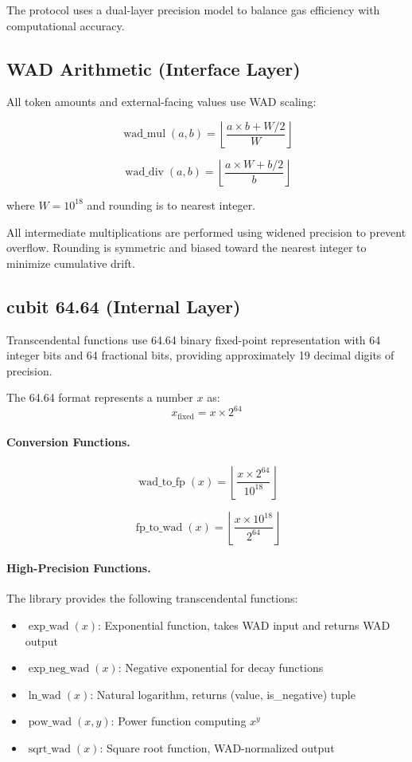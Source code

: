 The protocol uses a dual-layer precision model to balance gas efficiency with computational accuracy.

\subsection{WAD Arithmetic (Interface Layer)}

All token amounts and external-facing values use WAD scaling:

\[
\operatorname{wad\_mul}(a, b) = \left\lfloor \frac{a \times b + W/2}{W} \right\rfloor
\]

\[
\operatorname{wad\_div}(a, b) = \left\lfloor \frac{a \times W + b/2}{b} \right\rfloor
\]

where $W = 10^{18}$ and rounding is to nearest integer.

All intermediate multiplications are performed using widened precision to prevent overflow. Rounding is symmetric and biased toward the nearest integer to minimize cumulative drift.

\subsection{cubit 64.64 (Internal Layer)}

Transcendental functions use 64.64 binary fixed-point representation with 64 integer bits and 64 fractional bits, providing approximately 19 decimal digits of precision.

The 64.64 format represents a number $x$ as:
\[
x_{\text{fixed}} = x \times 2^{64}
\]

\paragraph{Conversion Functions.}

\[
\operatorname{wad\_to\_fp}(x) = \left\lfloor \frac{x \times 2^{64}}{10^{18}} \right\rfloor
\]

\[
\operatorname{fp\_to\_wad}(x) = \left\lfloor \frac{x \times 10^{18}}{2^{64}} \right\rfloor
\]

\paragraph{High-Precision Functions.}

The library provides the following transcendental functions:

\begin{itemize}
\item $\operatorname{exp\_wad}(x)$: Exponential function, takes WAD input and returns WAD output
\item $\operatorname{exp\_neg\_wad}(x)$: Negative exponential for decay functions
\item $\operatorname{ln\_wad}(x)$: Natural logarithm, returns (value, is\_negative) tuple
\item $\operatorname{pow\_wad}(x, y)$: Power function computing $x^y$
\item $\operatorname{sqrt\_wad}(x)$: Square root function, WAD-normalized output
\end{itemize}

